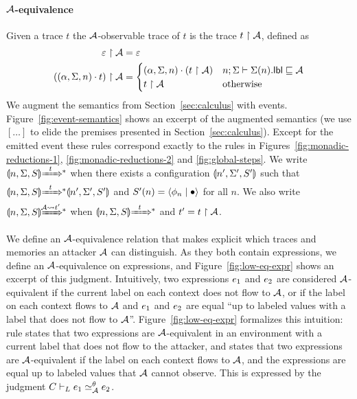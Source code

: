 \paragraph{$\mathcal{A}$-equivalence}
Given a trace $t$ the $\mathcal{A}$-observable trace of $t$ is the trace $t \upharpoonright \mathcal{A}$, defined as
\begin{align*}
\varepsilon \upharpoonright \mathcal{A} &= \varepsilon\\
((\alpha, \Sigma, n) \cdot t) \upharpoonright \mathcal{A} &=
\begin{cases}
(\alpha, \Sigma, n) \cdot (t \upharpoonright \mathcal{A}) & n; \Sigma \vdash \Sigma(n).\mathsf{lbl} \sqsubseteq \mathcal{A} \\
t \upharpoonright \mathcal{A} & \text{otherwise}
\end{cases}
\end{align*}
We augment the semantics from Section~\ref{sec:calculus} with events. Figure~\ref{fig:event-semantics} shows an excerpt of the augmented semantics (we use $[\ldots]$ to elide the premises presented in Section~\ref{sec:calculus}). Except for the emitted event these rules correspond exactly to the rules in Figures~\ref{fig:monadic-reductions-1}, \ref{fig:monadic-reductions-2} and \ref{fig:global-steps}. We write $\gconfig{n}{\env}{S} \gstepstos[][t]$ when there exists a configuration $\llparenthesis n', \Sigma', S' \rrparenthesis$ such that $\gconfig{n}{\env}{S} \gstepstos[][t] \gconfig{n'}{\env'}{S'}$ and $S'(n) = \langle \phi_n \mid \bullet \rangle$ for all $n$. We also write $\gconfig{n}{\env}{S} \gstepstos[][\Attacker \filtertrace t']$ when $\gconfig{n}{\env}{S} \gstepstos[][t]$ and $t' = t \upharpoonright \mathcal{A}$.

We define an $\mathcal{A}$-equivalence relation that makes explicit which traces and memories an attacker $\mathcal{A}$ can distinguish. As they both contain expressions, we define an $\mathcal{A}$-equivalence on expressions, and Figure~\ref{fig:low-eq-expr} shows an excerpt of this judgment. Intuitively, two expressions $e_1$ and $e_2$ are considered $\mathcal{A}$-equivalent if the current label on each context does not flow to $\mathcal{A}$, or if the label on each context flows to $\mathcal{A}$ and $e_1$ and $e_2$ are equal ``up to labeled values with a label that does not flow to $\mathcal{A}$''. Figure~\ref{fig:low-eq-expr} formalizes this intuition: rule  states that two expressions are $\mathcal{A}$-equivalent in an environment with a current label that does not flow to the attacker, and  states that two expressions are $\mathcal{A}$-equivalent if the label on each context flows to $\mathcal{A}$, and the expressions are equal up to labeled values that $\mathcal{A}$ cannot observe. This is expressed by the judgment $\loweql{C}{\Attacker}[\bijection]{\expr_1}{\expr_2}$.

